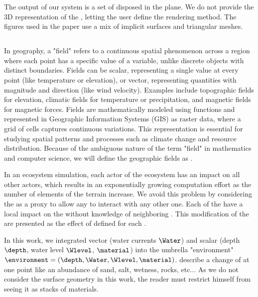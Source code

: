 The output of our system is a set of  disposed in the plane. We do not provide the 3D representation of the , letting the user define the rendering method. The figures used in the paper use a mix of implicit surfaces and triangular meshes.

\subsection{}
\label{sec:semantic-representation_communication}

In geography, a "field" refers to a continuous spatial phenomenon across a region where each point has a specific value of a variable, unlike discrete objects with distinct boundaries. Fields can be scalar, representing a single value at every point (like temperature or elevation), or vector, representing quantities with magnitude and direction (like wind velocity). Examples include topographic fields for elevation, climatic fields for temperature or precipitation, and magnetic fields for magnetic forces. Fields are mathematically modeled using functions and represented in Geographic Information Systems (GIS) as raster data, where a grid of cells captures continuous variations. This representation is essential for studying spatial patterns and processes such as climate change and resource distribution. Because of the ambiguous nature of the term "field" in mathematics and computer science, we will define the geographic fields as .

In an ecosystem simulation, each actor of the ecosystem has an impact on all other actors, which results in an exponentially growing computation effort as the number of elements of the terrain increase. We avoid this problem by considering the  as a proxy to allow any  to interact with any other one. Each of the  have a local impact on the  without knowledge of neighboring . This modification of the  are presented as the effect of  defined for each . %

In this work, we integrated vector  (water currents $\Water$) and scalar  (depth $\depth$, water level $\Wlevel$,  $\material$) into the umbrella "environment" $\environment = \left( \depth, \Water, \Wlevel, \material \right)$.  describe a change of  at one point like an abundance of sand, salt, wetness, rocks, etc... As we do not consider the surface geometry in this work, the reader must restrict himself from seeing it as stacks of materials.


